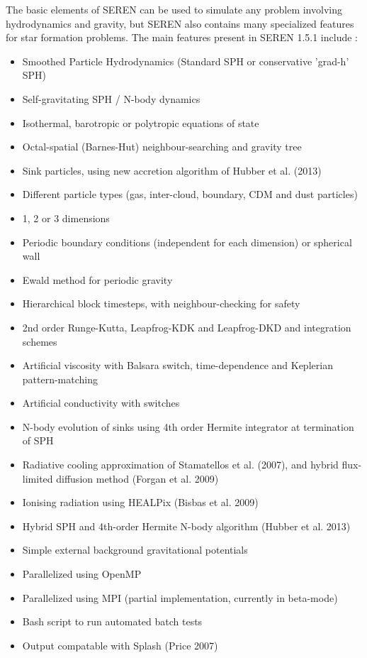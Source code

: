\documentclass[a4paper]{article}
\newcommand{\VERNO}{1.5.1 }
\begin{document}
The basic elements of SEREN can be used to simulate any problem involving hydrodynamics and gravity, but SEREN also contains many specialized features for star formation problems.  The main features present in SEREN \VERNO  include : 
\begin{itemize}
\item Smoothed Particle Hydrodynamics (Standard SPH or conservative 'grad-h' SPH)
\item Self-gravitating SPH / N-body dynamics
\item Isothermal, barotropic or polytropic equations of state
\item Octal-spatial (Barnes-Hut) neighbour-searching and gravity tree
\item Sink particles, using new accretion algorithm of Hubber et al. (2013)
\item Different particle types (gas, inter-cloud, boundary, CDM and dust particles)
\item 1, 2 or 3 dimensions
\item Periodic boundary conditions (independent for each dimension) or spherical wall
\item Ewald method for periodic gravity
\item Hierarchical block timesteps, with neighbour-checking for safety
\item 2nd order Runge-Kutta, Leapfrog-KDK and Leapfrog-DKD and integration schemes
\item Artificial viscosity with Balsara switch, time-dependence and Keplerian pattern-matching
\item Artificial conductivity with switches
\item N-body evolution of sinks using 4th order Hermite integrator at termination of SPH
\item Radiative cooling approximation of Stamatellos et al. (2007), and hybrid flux-limited diffusion method (Forgan et al. 2009)
\item Ionising radiation using HEALPix (Bisbas et al. 2009)
\item Hybrid SPH and 4th-order Hermite N-body algorithm (Hubber et al. 2013)
\item Simple external background gravitational potentials
\item Parallelized using OpenMP
\item Parallelized using MPI (partial implementation, currently in beta-mode)
\item Bash script to run automated batch tests
\item Output compatable with Splash (Price 2007)
\end{itemize}
\end{document}
